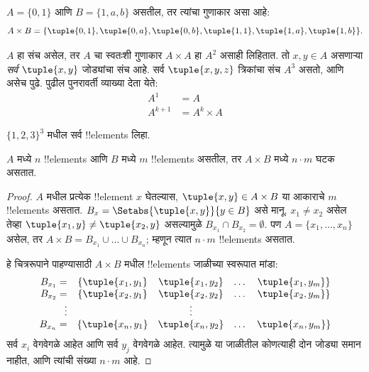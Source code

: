 \documentclass[../../../include/open-logic-section]{subfiles}
\begin{document}
\begin{ex}
$A = \{0, 1\}$ आणि $B = \{1, a, b\}$ असतील, तर त्यांचा गुणाकार असा आहे:
\[
A \times B = \{ \tuple{0, 1}, \tuple{0, a}, \tuple{0, b},
    \tuple{1, 1}, \tuple{1, a}, \tuple{1, b} \}.
\]
\end{ex}

\begin{ex}
$A$ हा संच असेल, तर $A$ चा स्वतःशी गुणाकार $A \times A$ हा $A^2$
असाही लिहितात. तो $x, y \in A$ असणाऱ्या \emph{सर्व} $\tuple{x, y}$ जोड्यांचा
संच आहे. सर्व $\tuple{x, y, z}$ त्रिकांचा संच $A^3$ असतो, आणि असेच पुढे.
पुढील पुनरावर्ती व्याख्या देता येते:
\begin{align*}
  A^1 & = A\\
  A^{k+1} & = A^k \times A
\end{align*}
\end{ex}

\begin{prob}
$\{1, 2, 3\}^3$ मधील सर्व !!{element}s लिहा.
\end{prob}

\begin{prop}
$A$ मध्ये $n$ !!{element}s आणि $B$ मध्ये $m$ !!{element}s असतील,
तर $A
\times B$ मध्ये $n\cdot m$ घटक असतात.
\end{prop}

\begin{proof}
$A$ मधील प्रत्येक !!{element} $x$ घेतल्यास, $\tuple{x, y} \in A \times B$
या आकाराचे $m$ !!{element}s असतात.
$B_x = \Setabs{\tuple{x, y}}{y
  \in B}$ असे मानू. $x_1 \neq x_2$ असेल तेव्हा $\tuple{x_1, y} \neq
\tuple{x_2, y}$ असल्यामुळे $B_{x_1} \cap B_{x_2} = \emptyset$.
पण $A = \{x_1,
\dots, x_n\}$ असेल, तर $A \times B = B_{x_1} \cup \dots \cup B_{x_n}$;
म्हणून त्यात $n\cdot m$ !!{element}s असतात.

हे चित्ररूपाने पाहण्यासाठी $A \times B$ मधील !!{element}s जाळीच्या स्वरूपात मांडा:
\[
\begin{array}{rcccc}
  B_{x_1} = & \{\tuple{x_1, y_1} & \tuple{x_1, y_2} & \dots & \tuple{x_1, y_m}\}\\
  B_{x_2} = & \{\tuple{x_2, y_1} & \tuple{x_2, y_2} & \dots & \tuple{x_2, y_m}\}\\
  \vdots & & \vdots\\
  B_{x_n} = & \{\tuple{x_n, y_1} & \tuple{x_n, y_2} & \dots & \tuple{x_n, y_m}\}
\end{array}
\]
सर्व $x_i$ वेगवेगळे आहेत आणि सर्व $y_j$ वेगवेगळे आहेत. त्यामुळे या जाळीतील
कोणत्याही दोन जोड्या समान नाहीत, आणि त्यांची संख्या $n\cdot m$ आहे.
\end{proof}
\end{document}
